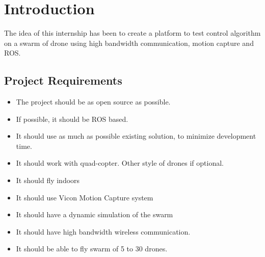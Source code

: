 \chapter{Introduction}

The idea of this internship has been to create a platform to test control algorithm on a swarm of drone using high bandwidth communication, motion capture and ROS.





\section{Project Requirements}
\begin{itemize}
    \item The project should be as open source as possible.
    \item If possible, it should be ROS based.
    \item It should use as much as possible existing solution, to minimize development time.
    \item It should work with quad-copter. Other style of drones if optional.
    \item It should fly indoors
    \item It should use Vicon Motion Capture system
    \item It should have a dynamic simulation of the swarm
    \item It should have high bandwidth wireless communication.
    \item It should be able to fly swarm of 5 to 30 drones.
\end{itemize}
